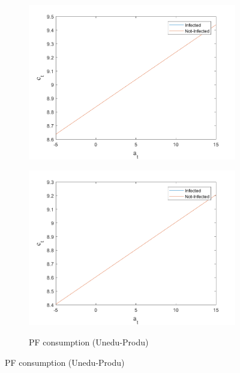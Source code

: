\begin{figure}[H]
\begin{subfigure}{0.5\textwidth}
   \includegraphics[width=\linewidth,height = 0.22\textheight]{figures/pre/FIG7.png}
    \label{fig_dert}
\end{subfigure}
\hspace*{\fill}
\begin{subfigure}{0.5\textwidth}\caption{PF consumption (Unedu-Produ)}
   \includegraphics[width=\linewidth,height = 0.22\textheight]{figures/pre/FIG8.png}
    \label{fig:x_b}
\end{subfigure}
\hspace*{\fill}
\label{lafigura1}
\end{figure}
\newpage
